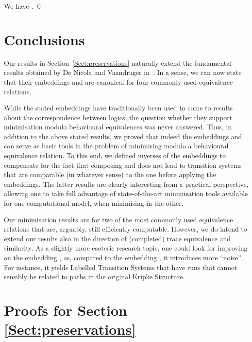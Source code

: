 \documentclass{llncs}
\begin{document}
\begin{theorem}
\label{th:lts2ks_stut_minimal}
We have .
\qed
\end{theorem}



\section{Conclusions}\label{Sect::conc}

Our results in Section~\ref{Sect:preservations} naturally extend
the fundamental results obtained by De Nicola and Vaandrager
in~\cite{DBLP:conf/litp/NicolaV90,DBLP:journals/jacm/NicolaV95}.
In a sense, we can now state that their embeddings
 and  are canonical for four commonly used equivalence
relations.

While the stated embeddings have traditionally been used to come to
results about the correspondence between logics, the question whether
they support minimisation modulo behavioural equivalences was never
answered. Thus, in addition to the above stated results, we proved that
indeed the embeddings  and  can serve as basic tools in the
problem of minimising modulo a behavioural equivalence relation. To this
end, we defined inverses of the embeddings to compensate for the fact that
composing  and  does not lead to transition systems that are
comparable (in whatever sense) to the one before applying the embeddings.
The latter results are clearly interesting from a practical perspective,
allowing one to take full advantage of state-of-the-art minimisation
tools available for one computational model, when minimising in the other.

Our minimisation results are for two of the most commonly used equivalence
relations that are, arguably, still efficiently computable. However,
we do intend to extend our results also in the direction of (completed)
trace equivalence and similarity. As a slightly more esoteric research
topic, one could look for improving on the embedding , as, compared
to the embedding , it introduces more ``noise''. For instance, it
yields Labelled Transition Systems that have runs that cannot sensibly
be related to paths in the original Kripke Structure.





\cleardoublepage
\appendix
\section{Proofs for Section \ref{Sect:preservations}}
\end{document}

